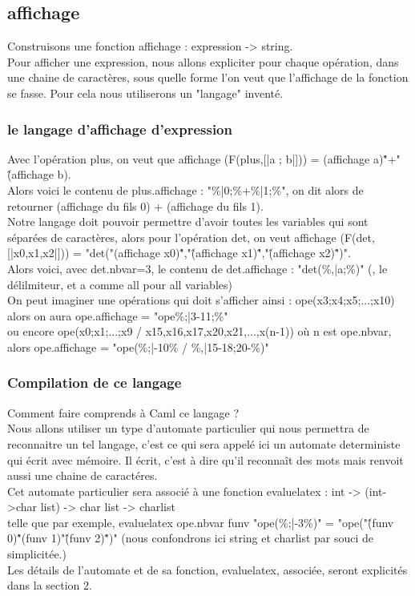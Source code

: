 \documentclass{article}
\theoremstyle{definition}
\begin{document}
\subsection{affichage}
Construisons une fonction affichage : expression -> string.\\
Pour afficher une expression, nous allons expliciter pour chaque op\'eration, dans une chaine de caract\`eres, sous quelle forme l'on veut que l'affichage de la fonction se fasse. Pour cela nous utiliserons un "langage" invent\'e.
\subsubsection{le langage d'affichage d'expression}
Avec l'op\'eration plus, on veut que affichage (F(plus,[|a ; b|])) = (affichage a)\^"+"\^(affichage b).\\ Alors voici le contenu de plus.affichage : "\%|0;\%+\%|1;\%", on dit alors de retourner (affichage du fils 0) + (affichage du fils 1).\\
Notre langage doit pouvoir permettre d'avoir toutes les variables qui sont s\'epar\'ees de caract\`eres, alors pour l'op\'eration det, on veut affichage (F(det,[|x0,x1,x2|])) = "det("(affichage x0)\^","\^(affichage x1)\^","\^(affichage x2)\^")".\\ Alors voici, avec det.nbvar=3, le contenu de det.affichage : "det(\%,|a;\%)" (, le d\'elilmiteur, et a comme all pour all variables)\\
On peut imaginer une op\'erations qui doit s'afficher ainsi : ope(x3;x4;x5;...;x10) alors on aura ope.affichage = "ope\%;|3-11;\%"\\
ou encore ope(x0;x1;...;x9 / x15,x16,x17,x20,x21,...,x(n-1)) o\`u n est ope.nbvar, alors ope.affichage = "ope(\%;|-10\% / \%,|15-18;20-\%)"
\subsubsection{Compilation de ce langage}
Comment faire comprends \`a Caml ce langage ?\\
Nous allons utiliser un type d'automate particulier qui nous permettra de reconnaitre un tel langage, c'est ce qui sera appel\'e ici un automate deterministe qui \'ecrit avec m\'emoire. Il \'ecrit, c'est \`a dire qu'il reconna\^it des mots mais renvoit aussi une chaine de caract\'eres.\\
Cet automate particulier sera associ\'e \`a une fonction evaluelatex : int -> (int->char list) -> char list -> charlist\\ telle que par exemple, evaluelatex ope.nbvar funv "ope(\%;|-3\%)" = "ope("\^(funv 0)\^"(funv 1)"\^(funv 2)\^")" (nous confondrons ici string et charlist par souci de simplicit\'ee.)\\
Les d\'etails de l'automate et de sa fonction, evaluelatex, associ\'ee, seront explicit\'es dans la section 2.
\end{document}
